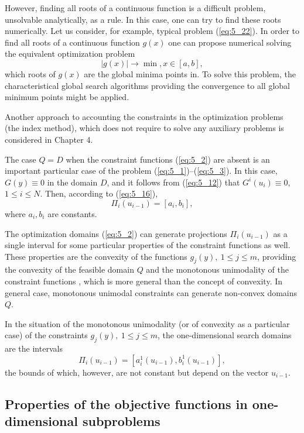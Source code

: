 However, finding all roots of a continuous function is a difficult problem, unsolvable analytically, as a rule. In this case, one can try to find these roots numerically. Let us consider, for example, typical problem (\ref{eq:5_22}). In order to find all roots of a continuous function $g(x)$ one can propose  numerical solving  the equivalent optimization problem 
\begin{displaymath}
\left|g(x)\right|\rightarrow \min,x\in [a,b],
\end{displaymath}
which roots of $g(x)$ are the global minima points in. To solve this problem, the characteristical global search algorithms providing the convergence to all global minimum points might be applied.

Another approach to accounting the constraints in the optimization problems (the index method), which does not require to solve any auxiliary problems  is considered in Chapter 4.

The case $Q=D$  when the constraint functions (\ref{eq:5_2}) are absent is an important particular case of the problem (\ref{eq:5_1})--(\ref{eq:5_3}). In this case, $G(y)\equiv 0$ in the domain $D$, and it follows from (\ref{eq:5_12}) that $G^i(u_i)\equiv 0$,$1\leq i\leq N$. Then, according to (\ref{eq:5_16}), 
\begin{displaymath}
\Pi_i(u_{i-1})=[a_i,b_i],
\end{displaymath}
where $a_i,b_i$ are constants.

The optimization domains (\ref{eq:5_2}) can generate projections $\Pi_i(u_{i-1})$  as a single interval for some particular properties of the constraint functions as well. These properties are the convexity of the functions $g_j(y),\:1\leq j\leq m$, providing the convexity of the feasible domain $Q$ and the monotonous unimodality of the constraint functions \cite{5_GrishaginStrongin_EnginCybernetics}, which is more general than the concept of convexity.  In general case, monotonous unimodal constraints can generate non-convex domains $Q$.

In the situation of the monotonous unimodality (or of convexity as a particular case) of the constraints $g_j(y),\:1\leq j\leq m$, the one-dimensional search domains are the intervals 
\begin{displaymath}
\Pi_i(u_{i-1})=[a_i^1(u_{i-1}),b_i^1(u_{i-1})],
\end{displaymath}
the bounds of which, however, are not constant but depend on the vector $u_{i-1}$.
\subsection {Properties of the objective functions in one-dimensional subproblems}
\label{subsec:5_2_2}

